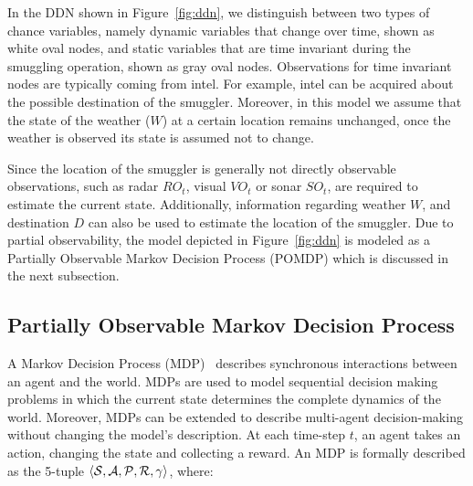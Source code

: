 \documentclass[conference]{IEEEtran}
\begin{document}
In the DDN shown in Figure~\ref{fig:ddn}, we distinguish between two types of chance variables, namely dynamic variables that change over time, shown as white oval nodes, and static variables that are time invariant during the smuggling operation, shown as gray oval nodes. Observations for time invariant nodes are typically coming from intel. For example, intel can be acquired about the possible destination of the smuggler. Moreover, in this model we assume that the state of the weather ($W$) at a certain location remains unchanged, \ie once the weather is observed its state is assumed not to change.

Since the location of the smuggler is generally not directly observable observations, such as radar $RO_t$, visual $VO_t$ or sonar $SO_t$, are required to estimate the current state. Additionally, information regarding weather $W$, and destination $D$ can also be used to estimate the location of the smuggler. Due to partial observability, the model depicted in Figure~\ref{fig:ddn} is modeled as a Partially Observable Markov Decision Process (POMDP) which is discussed in the next subsection.


\subsection{Partially Observable Markov Decision Process}
\label{sub:pomdp}

A Markov Decision Process (MDP)~\cite{bellman1957dynamic,mdp} describes synchronous interactions between an agent and the world. MDPs are used to model sequential decision making problems in which the current state determines the complete dynamics of the world. Moreover, MDPs can be extended to describe multi-agent decision-making without changing the model's description. At each time-step $t$, an agent takes an action, changing the state and collecting a reward. An MDP is formally described as the 5-tuple $\langle{\mathcal{S}},\mathcal{A},{\mathcal{P}},{\mathcal{R}},\gamma\rangle$, where:
\end{document}
